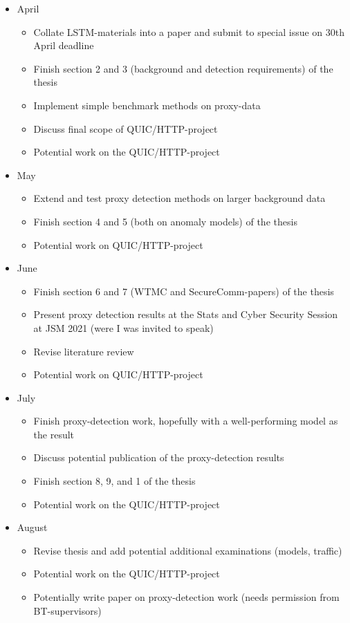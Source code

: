 \documentclass[a4paper,12pt,twoside]{article}
\begin{document}
\begin{itemize}


\item April
\begin{itemize}
\item Collate LSTM-materials into a paper and submit to special issue on 30th April deadline
\item Finish section 2 and 3 (background and detection requirements) of the thesis
\item Implement simple benchmark methods on proxy-data
\item Discuss final scope of QUIC/HTTP-project
\item Potential work on the QUIC/HTTP-project
\end{itemize}

\item May
\begin{itemize}
\item Extend and test proxy detection methods on larger background data
\item Finish section 4 and 5 (both on anomaly models) of the thesis
\item Potential work on QUIC/HTTP-project
\end{itemize}

\item June
\begin{itemize}
\item Finish section 6 and 7 (WTMC and SecureComm-papers) of the thesis
\item Present proxy detection results at the Stats and Cyber Security Session at JSM 2021 (were I was invited to speak)
\item Revise literature review
\item Potential work on QUIC/HTTP-project
\end{itemize}

\item July
\begin{itemize}
\item Finish proxy-detection work, hopefully with a well-performing model as the result
\item Discuss potential publication of the proxy-detection results
\item Finish section 8, 9, and 1 of the thesis
\item Potential work on the QUIC/HTTP-project
\end{itemize}

\item August
\begin{itemize}
\item Revise thesis and add potential additional examinations (models, traffic)
\item Potential work on the QUIC/HTTP-project
\item Potentially write paper on proxy-detection work (needs permission from BT-supervisors)
\end{itemize}


\end{itemize}
\end{document}
